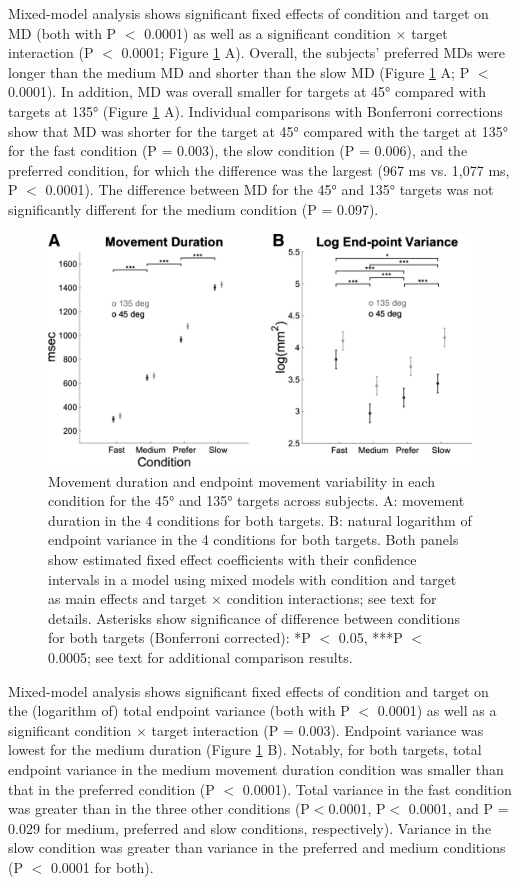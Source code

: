 Mixed-model analysis shows significant fixed effects of condition and target on MD (both with P $<$ 0.0001) as well as a significant condition $\times$ target interaction (P $<$ 0.0001; Figure \ref{fig:mt-data} A). Overall, the subjects’ preferred MDs were longer than the medium MD and shorter than the slow MD (Figure \ref{fig:mt-data} A; P $<$ 0.0001). In addition, MD was overall smaller for targets at \ang{45} compared with targets at \ang{135} (Figure \ref{fig:mt-data} A). Individual comparisons with Bonferroni corrections show that MD was shorter for the target at \ang{45} compared with the target at \ang{135} for the fast condition (P = 0.003), the slow condition (P = 0.006), and the preferred condition, for which the difference was the largest (967 ms vs. 1,077 ms, P $<$ 0.0001). The difference between MD for the \ang{45} and \ang{135} targets was not significantly different for the medium condition (P = 0.097). 

\begin{figure}
	\centering
	\includegraphics[width=0.8\linewidth]{figures/MT-data}
	\caption[Movement duration and endpoint movement variability]{Movement duration and endpoint movement variability in each condition for the \ang{45} and \ang{135} targets across subjects. A: movement duration in the 4 conditions for both targets. B: natural logarithm of endpoint variance in the 4 conditions for both targets. Both panels show estimated fixed effect coefficients with their confidence intervals in a model using mixed models with condition and target as main effects and target × condition interactions; see text for details. Asterisks show significance of difference between conditions for both targets (Bonferroni corrected): *P $<$ 0.05, ***P $<$ 0.0005; see text for additional comparison results.}
	\label{fig:mt-data}
\end{figure}


Mixed-model analysis shows significant fixed effects of condition and target on the (logarithm of) total endpoint variance (both with P $<$ 0.0001) as well as a significant condition $\times$ target interaction (P = 0.003). Endpoint variance was lowest for the medium duration (Figure \ref{fig:mt-data} B). Notably, for both targets, total endpoint variance in the medium movement duration condition was smaller than that in the preferred condition (P $<$ 0.0001). Total variance in the fast condition was greater than in the three other conditions (P$<$0.0001, P$<$ 0.0001, and P = 0.029 for medium, preferred and slow conditions, respectively). Variance in the slow condition was greater than variance in the preferred and medium conditions (P $<$ 0.0001 for both).

